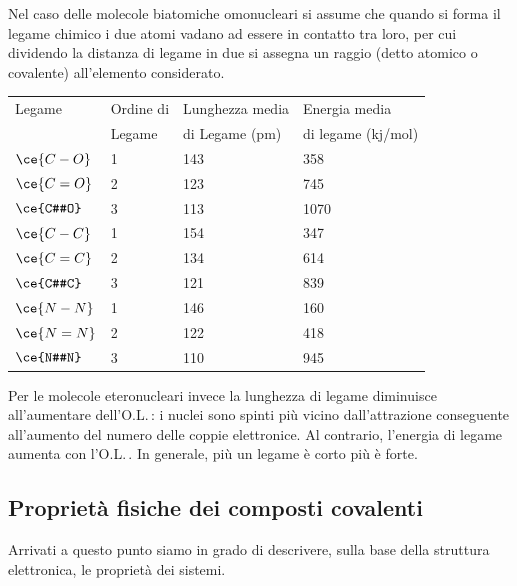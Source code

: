 Nel caso delle molecole biatomiche omonucleari si assume che quando si forma il legame chimico i due atomi vadano ad essere in contatto tra loro, per cui dividendo la distanza di legame in due si assegna un raggio (detto atomico o covalente) all'elemento considerato.

\begin{center}
    \begin{tabular}{m{2.7cm}m{2.3cm}m{3cm}m{2.7cm}}
        Legame & \hspace{-0.6cm}Ordine di & \hspace{-1cm}Lunghezza media & \hspace{-0.6cm}Energia media\\
        & \vspace{-0.3cm}\hspace{-0.5cm}Legame & \hspace{-0.9cm}di Legame (pm) & \hspace{-1cm}di legame (kj/mol)\\[0.2ex] 
        \hline
        $\ce{C-O}$ & 1 & 143 & 358\\
        $\ce{C=O}$ & 2 & 123 & 745\\
        $\ce{C#O}$ & 3 & 113 & \hspace{-0.1cm}1070\\
        $\ce{C-C}$ & 1 & 154 & 347\\
        $\ce{C=C}$ & 2 & 134 & 614\\
        $\ce{C#C}$ & 3 & 121 & 839\\
        $\ce{N-N}$ & 1 & 146 & 160\\
        $\ce{N=N}$ & 2 & 122 & 418\\
        $\ce{N#N}$ & 3 & 110 & 945
    \end{tabular}
\end{center}

Per le molecole eteronucleari invece la lunghezza di legame diminuisce all'aumentare dell'O.L.\,: i nuclei sono spinti più vicino dall'attrazione conseguente all'aumento del numero delle coppie elettronice. Al contrario, l'energia di legame aumenta con l'O.L.\,. In generale, più un legame è corto più è forte.

\subsection{Proprietà fisiche dei composti covalenti}
Arrivati a questo punto siamo in grado di descrivere, sulla base della struttura elettronica, le proprietà dei sistemi.

